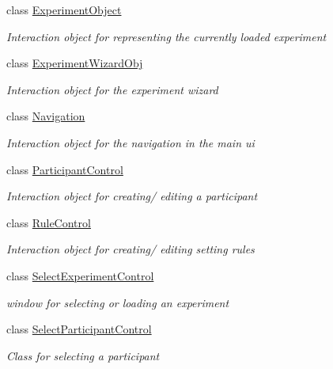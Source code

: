 \begin{DoxyCompactItemize}
class \hyperlink{class_web_analyzer_1_1_u_i_1_1_interaction_objects_1_1_experiment_object}{Experiment\+Object}
\begin{DoxyCompactList}\small\item\em Interaction object for representing the currently loaded experiment \end{DoxyCompactList}\item 
class \hyperlink{class_web_analyzer_1_1_u_i_1_1_interaction_objects_1_1_experiment_wizard_obj}{Experiment\+Wizard\+Obj}
\begin{DoxyCompactList}\small\item\em Interaction object for the experiment wizard \end{DoxyCompactList}\item 
class \hyperlink{class_web_analyzer_1_1_u_i_1_1_interaction_objects_1_1_navigation}{Navigation}
\begin{DoxyCompactList}\small\item\em Interaction object for the navigation in the main ui \end{DoxyCompactList}\item 
class \hyperlink{class_web_analyzer_1_1_u_i_1_1_interaction_objects_1_1_participant_control}{Participant\+Control}
\begin{DoxyCompactList}\small\item\em Interaction object for creating/ editing a participant \end{DoxyCompactList}\item 
class \hyperlink{class_web_analyzer_1_1_u_i_1_1_interaction_objects_1_1_rule_control}{Rule\+Control}
\begin{DoxyCompactList}\small\item\em Interaction object for creating/ editing setting rules \end{DoxyCompactList}\item 
class \hyperlink{class_web_analyzer_1_1_u_i_1_1_interaction_objects_1_1_select_experiment_control}{Select\+Experiment\+Control}
\begin{DoxyCompactList}\small\item\em window for selecting or loading an experiment \end{DoxyCompactList}\item 
class \hyperlink{class_web_analyzer_1_1_u_i_1_1_interaction_objects_1_1_select_participant_control}{Select\+Participant\+Control}
\begin{DoxyCompactList}\small\item\em Class for selecting a participant \end{DoxyCompactList}\item 

\end{DoxyCompactItemize}

